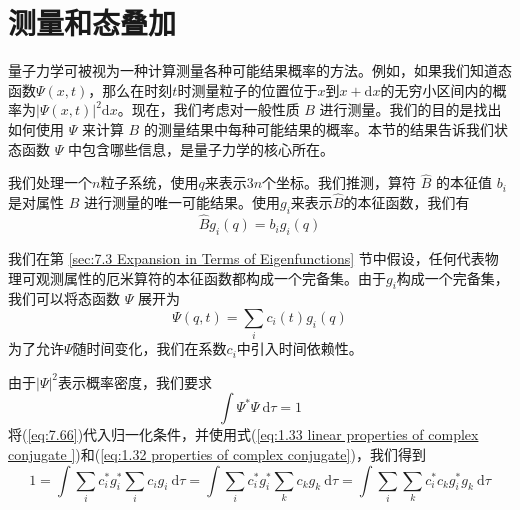 \section{测量和态叠加}
\label{sec:7.6 Measurement and the Superposition of States}
    量子力学可被视为一种计算测量各种可能结果概率的方法。例如，如果我们知道态函数$\Psi\left(x,t\right)$，那么在时刻$t$时测量粒子的位置位于$x$到$x+\mathrm{d}x$的无穷小区间内的概率为$\left|\Psi\left(x,t\right)\right|^2\mathrm{d}x$。现在，我们考虑对一般性质 $B$ 进行测量。我们的目的是找出如何使用 $\Psi$ 来计算 $B$ 的测量结果中每种可能结果的概率。本节的结果告诉我们状态函数 $\Psi$ 中包含哪些信息，是量子力学的核心所在。

    我们处理一个$n$粒子系统，使用$q$来表示$3n$个坐标。我们推测，算符 $\hat{B}$ 的本征值 $b_i$ 是对属性 $B$ 进行测量的唯一可能结果。使用$g_i$来表示$\hat{B}$的本征函数，我们有
    \begin{equation}
        \hat{B}g_i\left(q\right) = b_ig_i\left(q\right)
        \label{eq:7.65}
    \end{equation}

    我们在第 \ref{sec:7.3 Expansion in Terms of Eigenfunctions} 节中假设，任何代表物理可观测属性的厄米算符的本征函数都构成一个完备集。由于$g_i$构成一个完备集，我们可以将态函数 $\Psi$ 展开为
    \begin{equation}
        \Psi\left(q,t\right) = \sum_{i}c_i\left(t\right)g_i\left(q\right)
        \label{eq:7.66}
    \end{equation}
    为了允许$\Psi$随时间变化，我们在系数$c_i$中引入时间依赖性。

    由于$\left|\Psi\right|^2$表示概率密度，我们要求
    \begin{equation}
        \int\Psi^{\ast}\Psi \:\mathrm{d}\tau = 1
        \label{eq:7.67}
    \end{equation}
    将(\ref{eq:7.66})代入归一化条件，并使用式(\ref{eq:1.33 linear properties of complex conjugate })和(\ref{eq:1.32 properties of complex conjugate})，我们得到
    \begin{equation}
        1 = \int \sum_{i}c_i^{\ast}g_i^{\ast}\sum_ic_ig_i\:\mathrm{d}\tau = \int\sum_{i}c_i^{\ast}g_i^{\ast}\sum_kc_kg_k \:\mathrm{d}\tau = \int\sum_{i}\sum_{k}c_i^{\ast}c_k g_i^{\ast}g_k\:\mathrm{d}\tau
        \label{eq:7.68}
    \end{equation}

